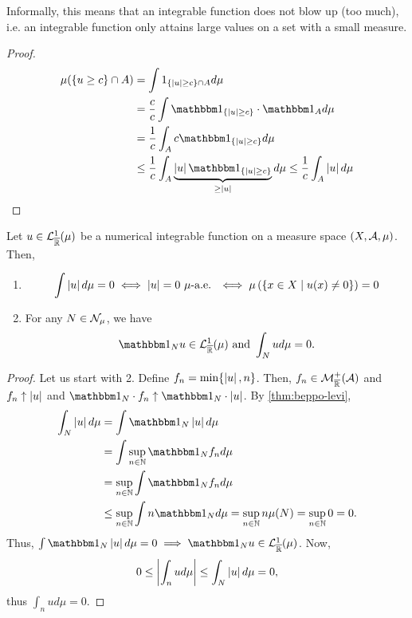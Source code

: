 Informally, this means that an integrable function does not blow up (too much), i.e. an integrable function only attains large values on a set with a small measure.

\begin{proof}
	\begin{align*}
		\mu(\{u \geq c\} \cap A)
		&= \int 1_{\{\abs{u} \geq c\} \cap A} d\mu \\
		&= \frac{c}{c} \int \ind_{\{\abs{u} \geq c\}} \cdot \ind_A d\mu\\
		&= \frac{1}{c} \int_A c \ind_{\{\abs{u} \geq c\}} d\mu\\
		&\leq \frac{1}{c} \int_A \underbrace{\abs{u}\ind_{\{\abs{u} \geq c\}}}_{\geq \abs{u}} d\mu
		\leq \frac{1}{c} \int_A \abs{u} d\mu
	\end{align*}
\end{proof}

\begin{thm}
	\label{thm:null-integral-ae}
	Let $u \in \mathcal{L}_{\overline{\mathbb{R}}}^1(\mu)$ be a numerical integrable function on a measure space $(X, \mathcal{A}, \mu)$. Then,
	\begin{enumerate}
		\item
		\begin{align}
			\int \left\vert{u}\right\vert d\mu = 0 \iff \left\vert{u}\right\vert = 0 \ \mu\text{-a.e. } \iff \mu\left(\left\{ x \in X \mid u(x) \neq 0 \right\}\right) = 0
		\end{align}
		\item For any $N \in \mathcal{N}_\mu$, we have
		\begin{align}
			\ind_N u \in \calL^1_\Rb(\mu) \text{ and }\int_N u d\mu = 0.
		\end{align}
	\end{enumerate}
\end{thm}

\begin{proof}
	Let us start with 2. Define $f_n = \min\{ \left\vert{u}\right\vert, n\}$. Then, $f_n \in \mathcal{M}_{\overline{\mathbb{R}}}^+(\mathcal{A})$ and $f_n \uparrow \left\vert{u}\right\vert$ and $\ind_N \cdot f_n \uparrow \ind_N \cdot \abs{u}$. By \autoref{thm:beppo-levi}, 
	\begin{align*}
		\int_N \abs{u} d\mu
		&= \int \ind_N \abs{u}d\mu\\
		&= \int \sup_{n\in \N} \ind_N f_n d\mu\\
		&= \sup_{n\in\N} \int \ind_N f_n d\mu\\
		&\leq \sup_{n\in \N} \int n \ind_N d\mu = \sup_{n\in\N} n \mu(N) = \sup_{n\in\N} 0 = 0.
	\end{align*}
	Thus, $\int \ind_N \abs{u} d\mu = 0 \implies \ind_N u \in  \calL_\Rb^1(\mu)$. Now,
	\begin{align*}
		0 \leq \left\vert{ \int_n u d\mu }\right\vert \leq \int_N \left\vert{u}\right\vert d\mu = 0,
	\end{align*}
	thus $\int_n u d\mu = 0$.
\end{proof}


